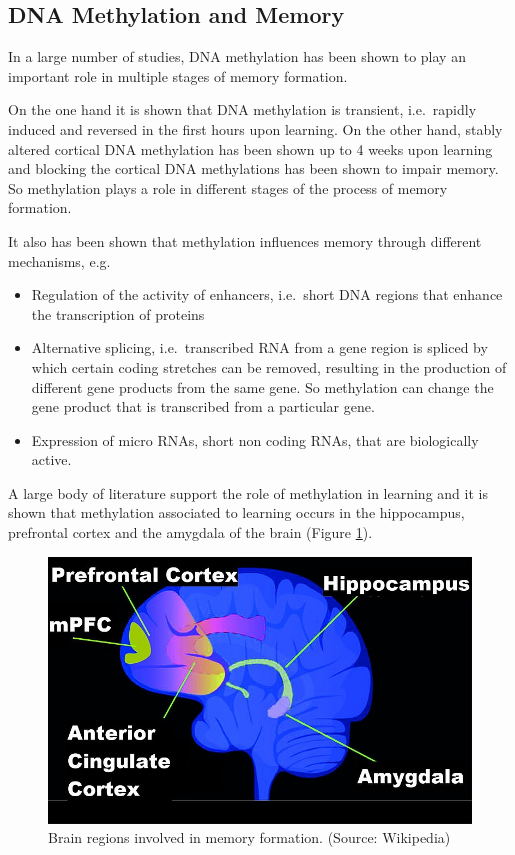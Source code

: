 \documentclass[
  11pt,
]{book}
\providecommand{\tightlist}{%
  \setlength{\itemsep}{0pt}\setlength{\parskip}{0pt}}
\begin{document}
\hypertarget{dna-methylation-and-memory}{%
\subsection{DNA Methylation and Memory}\label{dna-methylation-and-memory}}

In a large number of studies, DNA methylation has been shown to play an important role in multiple stages of memory formation.

On the one hand it is shown that DNA methylation is transient, i.e.~rapidly induced and reversed in the first hours upon learning. On the other hand, stably altered cortical DNA methylation has been shown up to 4 weeks upon learning and blocking the cortical DNA methylations has been shown to impair memory.
So methylation plays a role in different stages of the process of memory formation.

It also has been shown that methylation influences memory through different mechanisms, e.g.~

\begin{itemize}
\tightlist
\item
  Regulation of the activity of enhancers, i.e.~short DNA regions that enhance the transcription of proteins
\item
  Alternative splicing, i.e.~transcribed RNA from a gene region is spliced by which certain coding stretches can be removed, resulting in the production of different gene products from the same gene. So methylation can change the gene product that is transcribed from a particular gene.
\item
  Expression of micro RNAs, short non coding RNAs, that are biologically active.
\end{itemize}

A large body of literature support the role of methylation in learning and it is shown that methylation associated to learning occurs in the hippocampus, prefrontal cortex and the amygdala of the brain (Figure \ref{fig:brainRegionsLearning}).

\begin{figure}

{\centering \includegraphics[width=0.5\linewidth]{./figs/Brain_regions_in_memory_formation} 

}

\caption{Brain regions involved in memory formation. (Source: Wikipedia)}\label{fig:brainRegionsLearning}
\end{figure}
\end{document}
